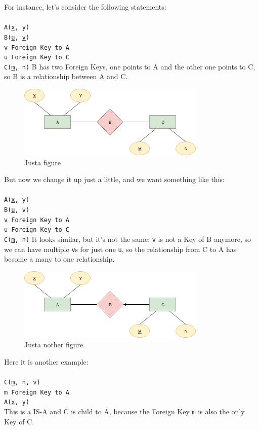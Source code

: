 \documentclass[12pt, oneside]{report}
\newcommand\tab[1][1cm]{\hspace*{#1}}
\begin{document}
For instance, let's consider the following statements:\\\\
\texttt{A(\underline{x}, y)}\\
\texttt{B(\underline{u}, \underline{v})}\\
\tab[.4cm] \texttt{v Foreign Key to A}\\
\tab[.4cm] \texttt{u Foreign Key to C}\\
\texttt{C(\underline{m}, n)}
\vskip 5pt
B has two Foreign Keys, one points to A and the other one points to C, so B is a relationship between A and C.
\begin{figure}[H]
	\centering
	\includegraphics[width=0.8\textwidth,keepaspectratio]{diagram3_00.png}
	\caption{Justa figure}
	\label{diagram3_00}
\end{figure}
\vskip 5pt
But now we change it up just a little, and we want something like this:\\\\
\texttt{A(\underline{x}, y)}\\
\texttt{B(\underline{u}, v)}\\
\tab[.4cm] \texttt{v Foreign Key to A}\\
\tab[.4cm] \texttt{u Foreign Key to C}\\
\texttt{C(\underline{m}, n)}
\vskip 5pt
It looks similar, but it's not the same: \texttt{v} is not a Key of B anymore, so we can have multiple \texttt{v}s for just one \texttt{u}, so the relationship from C to A has become a many to one relationship.
\begin{figure}[H]
	\centering
	\includegraphics[width=0.8\textwidth,keepaspectratio]{diagram3_01.png}
	\caption{Justa nother figure}
	\label{diagram3_01}
\end{figure}
\vskip 5pt
Here it is another example:\\\\
\texttt{C(\underline{m}, n, v)}\\
\tab[.4cm] \texttt{m Foreign Key to A}\\
\texttt{A(\underline{x}, y)}\\
\vskip 5pt
This is a IS-A and C is child to A, because the Foreign Key \texttt{m} is also the only Key of C.
\end{document}
